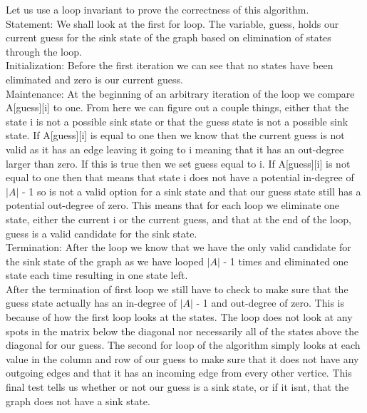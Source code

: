 \documentclass[11pt]{article}
\begin{document}
\begin{enumerate}
Let us use a loop invariant to prove the correctness of this algorithm.\\

Statement: We shall look at the first for loop. The variable, guess, holds our current guess for the sink state of the graph based on elimination of states through the loop.\\

Initialization: Before the first iteration we can see that no states have been eliminated and zero is our current guess.\\

Maintenance: At the beginning of an arbitrary iteration of the loop we compare A[guess][i] to one. From here we can figure out a couple things, either that the state i is not a possible sink state or that the guess state is not a possible sink state. If A[guess][i] is equal to one then we know that the current guess is not valid as it has an edge leaving it going to i meaning that it has an out-degree larger than zero. If this is true then we set guess equal to i. If A[guess][i] is not equal to one then that means that state i does not have a potential in-degree of $|A|$ - 1 so is not a valid option for a sink state and that our guess state still has a potential out-degree of zero. This means that for each loop we eliminate one state, either the current i or the current guess, and that at the end of the loop, guess is a valid candidate for the sink state.\\

Termination: After the loop we know that we have the only valid candidate for the sink state of the graph as we have looped $|A|$ - 1 times and eliminated one state each time resulting in one state left.\\

After the termination of first loop we still have to check to make sure that the guess state actually has an in-degree of $|A|$ - 1 and out-degree of zero. This is because of how the first loop looks at the states. The loop does not look at any spots in the matrix below the diagonal nor necessarily all of the states above the diagonal for our guess. The second for loop of the algorithm simply looks at each value in the column and row of our guess to make sure that it does not have any outgoing edges and that it has an incoming edge from every other vertice. This final test tells us whether or not our guess is a sink state, or if it isnt, that the graph does not have a sink state.\\



\end{enumerate}
\end{document}
